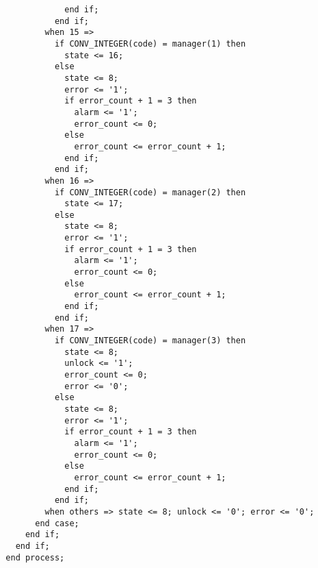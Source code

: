 \documentclass[a4paper]{article}
\begin{document}
\begin{lstlisting}
              end if;
            end if;
          when 15 =>
            if CONV_INTEGER(code) = manager(1) then
              state <= 16;
            else
              state <= 8;
              error <= '1';
              if error_count + 1 = 3 then
                alarm <= '1';
                error_count <= 0;
              else
                error_count <= error_count + 1;
              end if;
            end if;
          when 16 =>
            if CONV_INTEGER(code) = manager(2) then
              state <= 17;
            else
              state <= 8;
              error <= '1';
              if error_count + 1 = 3 then
                alarm <= '1';
                error_count <= 0;
              else
                error_count <= error_count + 1;
              end if;
            end if;
          when 17 =>
            if CONV_INTEGER(code) = manager(3) then
              state <= 8;
              unlock <= '1';
              error_count <= 0;
              error <= '0';
            else
              state <= 8;
              error <= '1';
              if error_count + 1 = 3 then
                alarm <= '1';
                error_count <= 0;
              else
                error_count <= error_count + 1;
              end if;
            end if;
          when others => state <= 8; unlock <= '0'; error <= '0';
        end case;
      end if;
    end if;
  end process;
  

\end{lstlisting}
\end{document}
